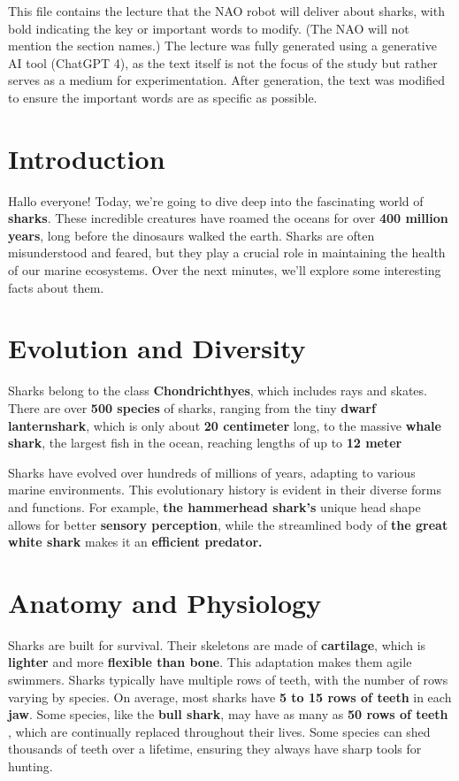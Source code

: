This file contains the lecture that the NAO robot will deliver about sharks, with bold indicating the key or important words to modify. (The NAO will not mention the section names.) The lecture was fully generated using a generative AI tool (ChatGPT 4), as the text itself is not the focus of the study but rather serves as a medium for experimentation. After generation, the text was modified to ensure the important words are as specific as possible.
\section{Introduction}
Hallo everyone! Today, we're going to dive deep into the fascinating world of \textbf{sharks}. These incredible creatures have roamed the oceans for over \textbf{400 million years}, long before the dinosaurs walked the earth. Sharks are often misunderstood and feared, but they play a crucial role in maintaining the health of our marine ecosystems. Over the next minutes, we’ll explore some interesting facts about them.

\section{Evolution and Diversity}
Sharks belong to the class \textbf{Chondrichthyes}, which includes rays and skates. There are over \textbf{500 species} of sharks, ranging from the tiny \textbf{dwarf lanternshark}, which is only about \textbf{20 centimeter} long, to the massive \textbf{whale shark}, the largest fish in the ocean, reaching lengths of up to \textbf{12 meter}

Sharks have evolved over hundreds of millions of years, adapting to various marine environments. This evolutionary history is evident in their diverse forms and functions. For example, \textbf{the hammerhead shark's} unique head shape allows for better \textbf{sensory perception}, while the streamlined body of \textbf{the great white shark} makes it an \textbf{efficient predator.}

\section{Anatomy and Physiology}
Sharks are built for survival. Their skeletons are made of \textbf{cartilage}, which is \textbf{lighter} and more \textbf{flexible than bone}. This adaptation makes them agile swimmers. Sharks typically have multiple rows of teeth, with the number of rows varying by species. On average, most sharks have\textbf{ 5 to 15 rows of teeth} in each \textbf{jaw}. Some species, like the \textbf{bull shark}, may have as many as\textbf{ 50 rows of teeth} , which are continually replaced throughout their lives. Some species can shed thousands of teeth over a lifetime, ensuring they always have sharp tools for hunting.

